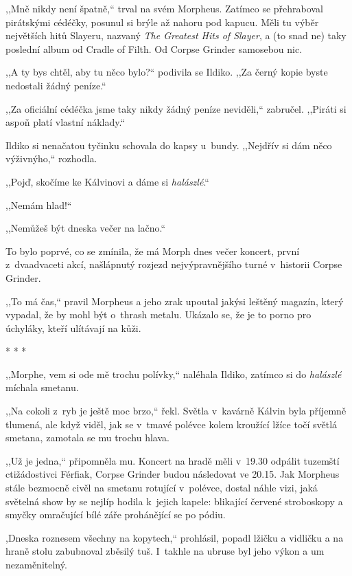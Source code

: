 ,,Mně nikdy není špatně,`` trval na svém Morpheus. Zatímco se přehraboval pirátskými cédéčky, posunul si brýle až nahoru pod kapucu. Měli tu výběr největších hitů Slayeru, nazvaný  \textit{The Greatest Hits of Slayer}, a (to snad ne) taky poslední album od Cradle of Filth. Od Corpse Grinder samosebou nic.

,,A ty bys chtěl, aby tu něco bylo?`` podivila se Ildiko. ,,Za černý kopie byste nedostali žádný peníze.``

,,Za oficiální cédéčka jsme taky nikdy žádný peníze neviděli,`` zabručel. ,,Piráti si aspoň platí vlastní náklady.``

Ildiko si nenačatou tyčinku schovala do kapsy u~bundy. ,,Nejdřív si dám něco výživnýho,`` rozhodla.

,,Pojď, skočíme ke Kálvinovi a dáme si \textit{halászlé}.``

,,Nemám hlad!``

,,Nemůžeš být dneska večer na lačno.``

To bylo poprvé, co se zmínila, že má Morph dnes večer koncert, první z dvaadvaceti akcí, našlápnutý rozjezd nejvýpravnějšího turné v historii Corpse Grinder.

,,To má čas,`` pravil Morpheus a jeho zrak upoutal jakýsi leštěný magazín, který vypadal, že by mohl být o~thrash metalu. Ukázalo se, že je to porno pro úchyláky, kteří ulítávají na kůži.

\begin{center}
* * *
\end{center} 

,,Morphe, vem si ode mě trochu polívky,`` naléhala Ildiko, zatímco si do \textit{halászlé} míchala smetanu.

,,Na cokoli z ryb je ještě moc brzo,`` řekl. Světla v kavárně Kálvin byla příjemně tlumená, ale když viděl, jak se v tmavé polévce kolem kroužící lžíce točí světlá smetana, zamotala se mu trochu hlava.

,,Už je jedna,`` připomněla mu. Koncert na hradě měli v 19.30 odpálit tuzemští ctižádostivci Férfiak, Corpse Grinder budou následovat ve 20.15. Jak Morpheus stále bezmocně civěl na smetanu rotující v polévce, dostal náhle vizi, jaká světelná show by se nejlíp hodila k jejich kapele: blikající červené stroboskopy a smyčky omračující bílé záře prohánějící se po pódiu.

,Dneska roznesem všechny na kopytech,`` prohlásil, popadl lžičku a vidličku a na hraně stolu zabubnoval zběsilý tuš. I~takhle na ubruse byl jeho výkon a um nezaměnitelný.

